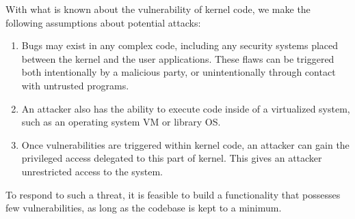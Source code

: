 With what is known about the vulnerability of kernel code, we make the
following assumptions about potential attacks:

\begin{enumerate}
\item  Bugs may exist in any complex code, including any security systems
placed between the kernel and the user applications. These flaws can be triggered
both intentionally by a malicious party, or unintentionally through contact with
untrusted programs.

\item An attacker also has the ability to execute code inside
of a virtualized system, such as an operating system VM or library OS.

\item Once vulnerabilities are triggered within kernel code, an attacker can gain the
privileged access delegated to this part of kernel. This gives an attacker unrestricted
access to the system.

\end{enumerate}

To respond to such a threat, it is feasible to build a functionality that
possesses few vulnerabilities, as long as the codebase is kept to a minimum.

